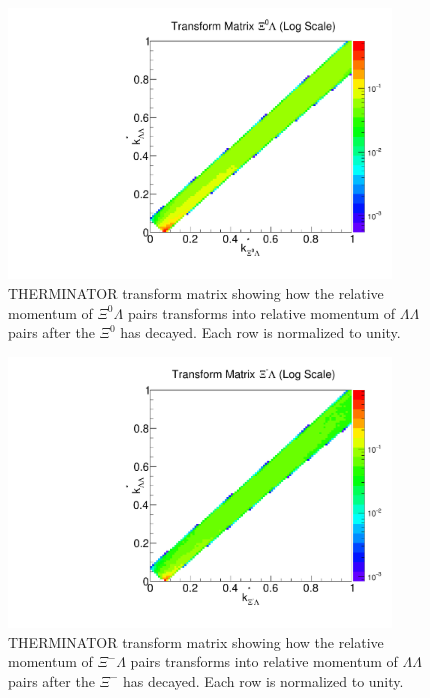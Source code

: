 \begin{figure}[hbt]
\begin{center}
\includegraphics[width=24pc]{Figures/TransformMatrices/2016-7-20-TransformMatrixXi0LambdaNormLog.pdf}
\end{center}
\caption[Transform matrix for $k^*_{\Xi^0\Lambda} \rightarrow k^*_{\Lambda\Lambda}$]{THERMINATOR \cite{Chojnacki:2011hb} transform matrix showing how the relative momentum of $\Xi^0\Lambda$ pairs transforms into relative momentum of $\Lambda\Lambda$ pairs after the $\Xi^0$ has decayed. Each row is normalized to unity.}
\label{fig:TherminatorX0L}
\end{figure}

\begin{figure}[hbt]
\begin{center}
\includegraphics[width=24pc]{Figures/TransformMatrices/2016-7-20-TransformMatrixXiCLambdaNormLog.pdf}
\end{center}
\caption[Transform matrix for $k^*_{\Xi^-\Lambda} \rightarrow k^*_{\Lambda\Lambda}$]{THERMINATOR \cite{Chojnacki:2011hb} transform matrix showing how the relative momentum of $\Xi^-\Lambda$ pairs transforms into relative momentum of $\Lambda\Lambda$ pairs after the $\Xi^-$ has decayed. Each row is normalized to unity.}
\label{fig:TherminatorXcL}
\end{figure}

